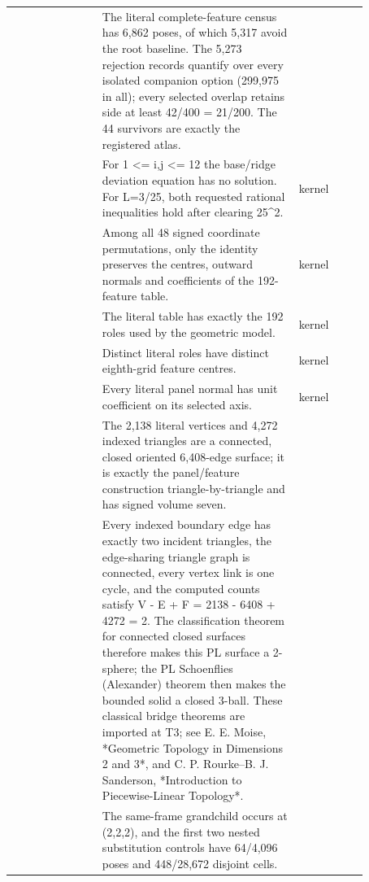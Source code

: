 {\begin{longtable}{L{0.22\linewidth} L{0.48\linewidth} L{0.17\linewidth}}
 & The literal complete-feature census has 6,862 poses, of which 5,317 avoid the root baseline. The 5,273 rejection records quantify over every isolated companion option (299,975 in all); every selected overlap retains side at least 42/\allowbreak{}400 = 21/\allowbreak{}200. The 44 survivors are exactly the registered atlas. &  \\
 & For 1 <= i,j <= 12 the base/\allowbreak{}ridge deviation equation has no solution. For L=3/\allowbreak{}25, both requested rational inequalities hold after clearing 25\textasciicircum{}2. & kernel  \\
 & Among all 48 signed coordinate permutations, only the identity preserves the centres, outward normals and coefficients of the 192-feature table. & kernel  \\
 & The literal table has exactly the 192 roles used by the geometric model. & kernel  \\
 & Distinct literal roles have distinct eighth-grid feature centres. & kernel  \\
 & Every literal panel normal has unit coefficient on its selected axis. & kernel  \\
 & The 2,138 literal vertices and 4,272 indexed triangles are a connected, closed oriented 6,408-edge surface; it is exactly the panel/\allowbreak{}feature construction triangle-by-triangle and has signed volume seven. &  \\
 & Every indexed boundary edge has exactly two incident triangles, the edge-sharing triangle graph is connected, every vertex link is one cycle, and the computed counts satisfy V - E + F = 2138 - 6408 + 4272 = 2. The classification theorem for connected closed surfaces therefore makes this PL surface a 2-sphere; the PL Schoenflies (Alexander) theorem then makes the bounded solid a closed 3-ball. These classical bridge theorems are imported at T3; see E. E. Moise, *Geometric Topology in Dimensions 2 and 3*, and C. P. Rourke--B. J. Sanderson, *Introduction to Piecewise-Linear Topology*. &  \\
 & The same-frame grandchild occurs at (2,2,2), and the first two nested substitution controls have 64/\allowbreak{}4,096 poses and 448/\allowbreak{}28,672 disjoint cells. &  \\

\end{longtable}}

